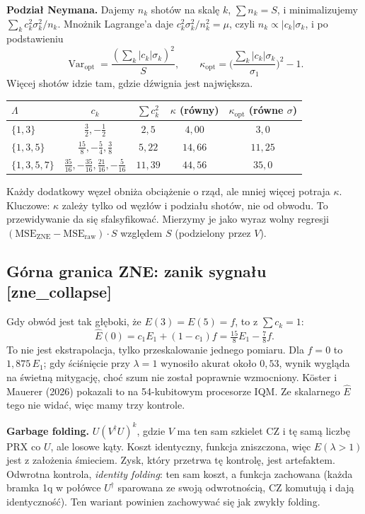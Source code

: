 \documentclass[11pt,a4paper]{article}
\newcommand{\slid}[1]{\hfill{\normalfont\small\ttfamily\color{axbluedk}[#1]}}
\newcommand{\Var}{\operatorname{Var}}
\begin{document}
\textbf{Podział Neymana.} Dajemy $n_k$ shotów na skalę $k$, $\sum n_k=S$, i minimalizujemy
$\sum_kc_k^2\sigma_k^2/n_k$. Mnożnik Lagrange'a daje $c_k^2\sigma_k^2/n_k^2=\mu$, czyli
$n_k\propto|c_k|\sigma_k$, i po podstawieniu
\[
  \Var_{\text{opt}}=\frac{(\sum_k|c_k|\sigma_k)^2}{S},\qquad
  \kappa_{\text{opt}}=\Big(\frac{\sum_k|c_k|\sigma_k}{\sigma_1}\Big)^2-1 .
\]
Więcej shotów idzie tam, gdzie dźwignia jest największa.

\begin{center}
\begin{tabular}{@{}lcccc@{}}
\toprule
$\Lambda$ & $c_k$ & $\sum c_k^2$ & $\kappa$ (równy) & $\kappa_{\text{opt}}$ (równe $\sigma$) \\
\midrule
$\{1,3\}$ & $\tfrac32,-\tfrac12$ & $2{,}5$ & $4{,}00$ & $3{,}0$ \\
$\{1,3,5\}$ & $\tfrac{15}8,-\tfrac54,\tfrac38$ & $5{,}22$ & $14{,}66$ & $11{,}25$ \\
$\{1,3,5,7\}$ & $\tfrac{35}{16},-\tfrac{35}{16},\tfrac{21}{16},-\tfrac5{16}$ & $11{,}39$ & $44{,}56$ & $35{,}0$ \\
\bottomrule
\end{tabular}
\end{center}

Każdy dodatkowy węzeł obniża obciążenie o rząd, ale mniej więcej potraja $\kappa$. Kluczowe:
$\kappa$ zależy tylko od węzłów i podziału shotów, nie od obwodu. To przewidywanie da się
sfalsyfikować. Mierzymy je jako wyraz wolny regresji
$(\mathrm{MSE}_{\text{ZNE}}-\mathrm{MSE}_{\text{raw}})\cdot S$ względem $S$ (podzielony przez $V$).

\subsection{Górna granica ZNE: zanik sygnału \slid{zne\_collapse}}

Gdy obwód jest tak głęboki, że $E(3)=E(5)=f$, to z $\sum c_k=1$:
\[
  \hat E(0)=c_1E_1+(1-c_1)f=\tfrac{15}8E_1-\tfrac78f .
\]
To nie jest ekstrapolacja, tylko przeskalowanie jednego pomiaru. Dla $f=0$ to $1{,}875\,E_1$;
gdy ściśnięcie przy $\lambda=1$ wynosiło akurat około $0{,}53$, wynik wygląda na świetną
mitygację, choć szum nie został poprawnie wzmocniony. Köster i Mauerer (2026) pokazali to na
54-kubitowym procesorze IQM. Ze skalarnego $\hat E$ tego nie widać, więc mamy trzy kontrole.

\textbf{Garbage folding.} $U(V^\dagger U)^k$, gdzie $V$ ma ten sam szkielet CZ i tę samą liczbę
PRX co $U$, ale losowe kąty. Koszt identyczny, funkcja zniszczona, więc $E(\lambda>1)$ jest z
założenia śmieciem. Zysk, który przetrwa tę kontrolę, jest artefaktem. Odwrotna kontrola,
\emph{identity folding}: ten sam koszt, a funkcja zachowana (każda bramka 1q w połówce $U^\dagger$
sparowana ze swoją odwrotnością, CZ komutują i dają identyczność). Ten wariant powinien zachowywać
się jak zwykły folding.
\end{document}
